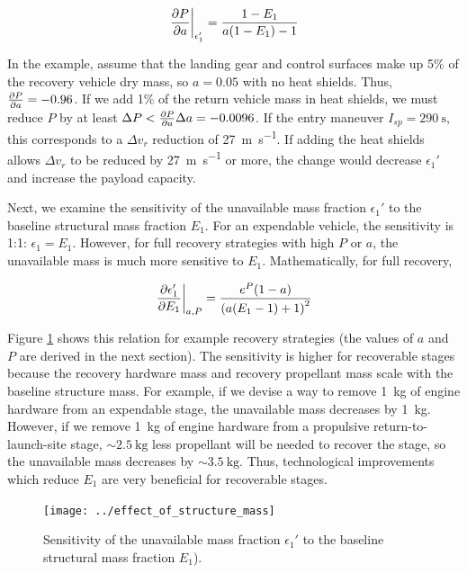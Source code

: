 \documentclass[conf]{new-aiaa}
\begin{document}
\begin{equation}
\left. \pdv{P}{a} \right|_{\epsilon_1'} = \frac{1 - E_1}{a(1 -E_1) - 1}
\end{equation}

In the example, assume that the landing gear and control surfaces make up 5\% of the recovery vehicle dry mass, so $a=0.05$ with no heat shields. Thus, $ \pdv{P}{a} = -0.96$. If we add 1\% of the return vehicle mass in heat shields, we must reduce $P$ by at least $\Delta P < \pdv{P}{a} \Delta a = -0.0096$. If the entry maneuver $I_{sp} = \SI{290}{\second}$, this corresponds to a $\Delta v_r$ reduction of \SI{27}{\meter\per\second}. If adding the heat shields allows $\Delta v_r$ to be reduced by \SI{27}{\meter\per\second} or more, the change would decrease $\epsilon_1'$ and increase the payload capacity.

Next, we examine the sensitivity of the unavailable mass fraction $\epsilon_1'$ to the baseline structural mass fraction $E_1$. For an expendable vehicle, the sensitivity is 1:1: $\epsilon_1 = E_1$. However, for full recovery strategies with high $P$ or $a$,  the unavailable mass is much more sensitive to $E_1$. Mathematically, for full recovery,

\begin{equation}
\left. \pdv{\epsilon_1'}{E_1} \right|_{a, P} = \frac{e^P (1 - a)}{\left(a(E_1 - 1) + 1 \right)^2}
\end{equation}

Figure \ref{fig:effect_of_structure_mass} shows this relation for example recovery strategies (the values of $a$ and $P$ are derived in the next section). The sensitivity is higher for recoverable stages because the recovery hardware mass and recovery propellant mass scale with the baseline structure mass. For example, if we devise a way to remove \SI{1}{\kilogram} of engine hardware from an expendable stage, the unavailable mass decreases by \SI{1}{\kilogram}. However, if we remove \SI{1}{\kilogram} of engine hardware from a propulsive return-to-launch-site stage, $\sim \SI{2.5}{\kilogram}$ less propellant will be needed to recover the stage, so the unavailable mass decreases by $\sim \SI{3.5}{\kilogram}$. Thus, technological improvements which reduce $E_1$ are very beneficial for recoverable stages.


\begin{figure}[hbt!]
	\centering
	\texttt{[image: ../effect\_of\_structure\_mass]}
	\caption{\label{fig:effect_of_structure_mass} Sensitivity of the unavailable mass fraction $\epsilon_1'$ to the baseline structural mass fraction $E_1$).}
\end{figure}
\end{document}
